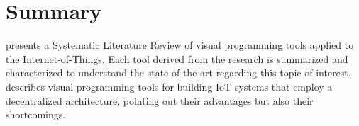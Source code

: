 \section{Summary}

 presents a Systematic Literature Review of visual programming tools applied to the Internet-of-Things. Each tool derived from the research is summarized and characterized to understand the state of the art regarding this topic of interest.  describes visual programming tools for building IoT systems that employ a decentralized architecture, pointing out their advantages but also their shortcomings.

